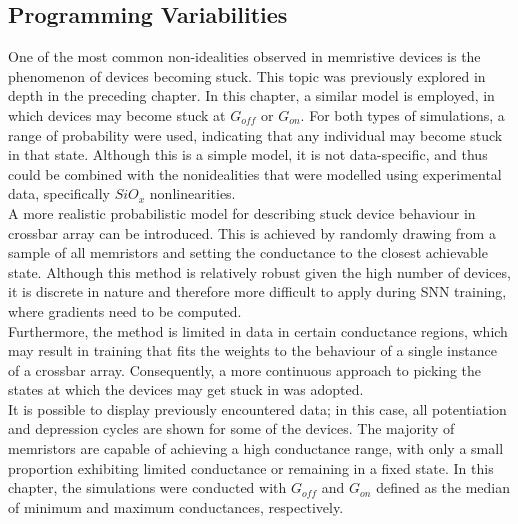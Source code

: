 
\subsection{Programming Variabilities}

One of the most common non-idealities observed in memristive devices is the phenomenon of devices becoming stuck. This topic was previously explored in depth in the preceding chapter. In this chapter, a similar model is employed, in which devices may become stuck at $G_{off}$ or $G_{on}$. For both types of simulations, a range of probability were used, indicating that any individual may become stuck in that state. Although this is a simple model, it is not data-specific, and thus could be combined with the nonidealities that were modelled using experimental data, specifically $SiO_x$ nonlinearities.\\

\noindent A more realistic probabilistic model for describing stuck device behaviour in crossbar array can be introduced. This is achieved by randomly drawing from a sample of all memristors and setting the conductance to the closest achievable state. Although this method is relatively robust given the high number of devices, it is discrete in nature and therefore more difficult to apply during SNN training, where gradients need to be computed. \\

\noindent Furthermore, the method is limited in data in certain conductance regions, which may result in training that fits the weights to the behaviour of a single instance of a crossbar array. Consequently, a more continuous approach to picking the states at which the devices may get stuck in was adopted.\\

\noindent It is possible to display previously encountered data; in this case, all potentiation and depression cycles are shown for some of the devices. The majority of memristors are capable of achieving a high conductance range, with only a small proportion exhibiting limited conductance or remaining in a fixed state. In this chapter, the simulations were conducted with $G_{off}$ and $G_{on}$ defined as the median of minimum and maximum conductances, respectively. \\

